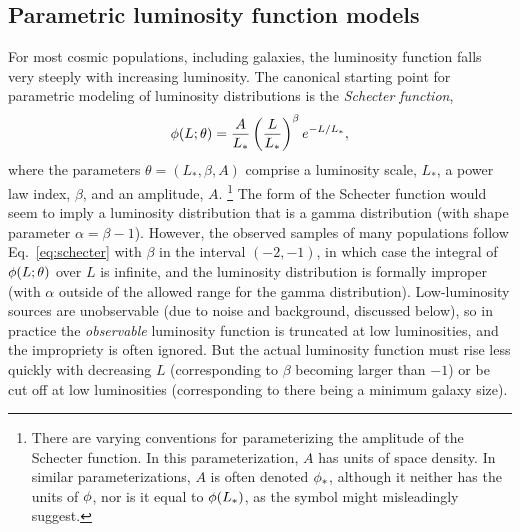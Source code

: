 
\subsection{Parametric luminosity function models}
\label{sec:lfmodels}

For most cosmic populations, including galaxies, the luminosity function falls very steeply with increasing luminosity.
The canonical starting point for parametric modeling of luminosity distributions is the \emph{Schecter function},
\begin{equation}
\phi(L;\theta) =
  \frac{A}{L_*} \left(\frac{L}{L_*}\right)^{\beta} e^{-L/L_*},
\label{eq:schecter}
\end{equation}
where the parameters $\theta = (L_*,\beta, A)$ comprise a luminosity scale, $L_*$, a power law index, $\beta$, and an amplitude, $A$.%
\footnote{There are varying conventions for parameterizing the amplitude of the Schecter function.
In this parameterization, $A$ has units of space density.
In similar parameterizations, $A$ is often denoted $\phi_*$, although it neither has the units of $\phi$, nor is it equal to $\phi(L_*)$, as the symbol might misleadingly suggest.}
The form of the Schecter function would seem to imply a luminosity distribution that is a gamma distribution (with shape parameter $\alpha = \beta - 1$).
However, the observed samples of many populations follow Eq.~\ref{eq:schecter} with $\beta$ in the interval $(-2,-1)$, in which case the integral of $\phi(L;\theta)$ over $L$ is infinite, and the luminosity distribution is formally improper (with $\alpha$ outside of the allowed range for the gamma distribution).
Low-luminosity sources are unobservable (due to noise and background, discussed below), so in practice the \emph{observable} luminosity function is truncated at low luminosities, and the impropriety is often ignored.
But the actual luminosity function must rise less quickly with decreasing $L$ (corresponding to $\beta$ becoming larger than $-1$) or be cut off at low luminosities (corresponding to there being a minimum galaxy size).


